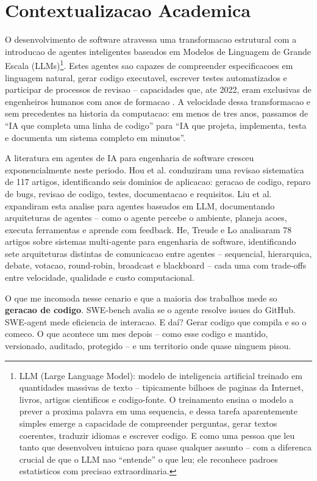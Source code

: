 \documentclass[12pt,a4paper,oneside,sumario=tradicional,chapter=TITLE,section=TITLE,subsection=TITLE,english,brazil]{abntex2}
\begin{document}
\section{Contextualizacao Academica}

O desenvolvimento de software atravessa uma transformacao estrutural com a introducao de agentes inteligentes baseados em Modelos de Linguagem de Grande Escala (LLMs)\footnote{LLM (Large Language Model): modelo de inteligencia artificial treinado em quantidades massivas de texto -- tipicamente bilhoes de paginas da Internet, livros, artigos cientificos e codigo-fonte. O treinamento ensina o modelo a prever a proxima palavra em uma sequencia, e dessa tarefa aparentemente simples emerge a capacidade de compreender perguntas, gerar textos coerentes, traduzir idiomas e escrever codigo. E como uma pessoa que leu tanto que desenvolveu intuicao para quase qualquer assunto -- com a diferenca crucial de que o LLM nao ``entende'' o que leu; ele reconhece padroes estatisticos com precisao extraordinaria.}. Estes agentes sao capazes de compreender especificacoes em linguagem natural, gerar codigo executavel, escrever testes automatizados e participar de processos de revisao -- capacidades que, ate 2022, eram exclusivas de engenheiros humanos com anos de formacao \cite{hou2024large,liu2024large}. A velocidade dessa transformacao e sem precedentes na historia da computacao: em menos de tres anos, passamos de ``IA que completa uma linha de codigo'' para ``IA que projeta, implementa, testa e documenta um sistema completo em minutos''.

A literatura em agentes de IA para engenharia de software cresceu exponencialmente neste periodo. Hou et al. \cite{hou2024large} conduziram uma revisao sistematica de 117 artigos, identificando seis dominios de aplicacao: geracao de codigo, reparo de bugs, revisao de codigo, testes, documentacao e requisitos. Liu et al. \cite{liu2024large} expandiram esta analise para agentes baseados em LLM, documentando arquiteturas de agentes -- como o agente percebe o ambiente, planeja acoes, executa ferramentas e aprende com feedback. He, Treude e Lo \cite{he2025llm} analisaram 78 artigos sobre sistemas multi-agente para engenharia de software, identificando sete arquiteturas distintas de comunicacao entre agentes -- sequencial, hierarquica, debate, votacao, round-robin, broadcast e blackboard -- cada uma com trade-offs entre velocidade, qualidade e custo computacional.

O que me incomoda nesse cenario e que a maioria dos trabalhos mede so \textbf{geracao de codigo}. SWE-bench \cite{jimenez2024swebench} avalia se o agente resolve issues do GitHub. SWE-agent \cite{yang2024sweagent} mede eficiencia de interacao. E daí? Gerar codigo que compila e so o comeco. O que acontece um mes depois -- como esse codigo e mantido, versionado, auditado, protegido -- e um territorio onde quase ninguem pisou.
\end{document}
